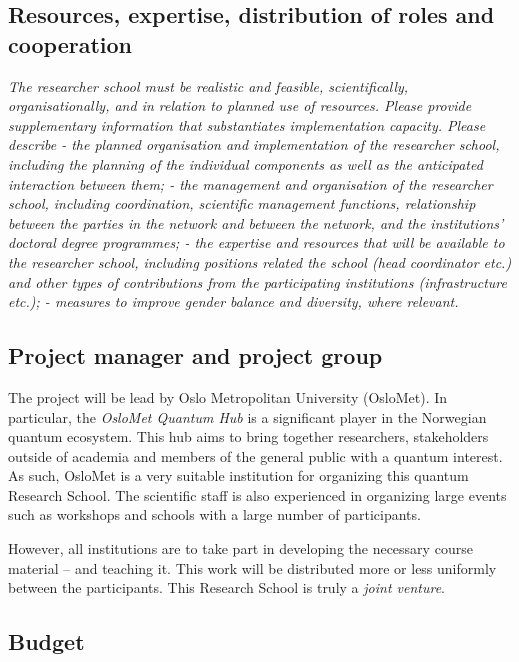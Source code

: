 \documentclass{scrreprt}
\begin{document}
\subsection{Resources, expertise, distribution of roles and cooperation}

\textit{The researcher school must be realistic and feasible, scientifically, organisationally, and in relation to planned use of resources. Please provide supplementary information that substantiates implementation capacity. Please describe
-	the planned organisation and implementation of the researcher school, including the planning of the individual components as well as the anticipated interaction between them;  
-	the management and organisation of the researcher school, including coordination, scientific management functions, relationship between the parties in the network and between the network, and the institutions’ doctoral degree programmes;  
-	the expertise and resources that will be available to the researcher school, including positions related the school (head coordinator etc.) and other types of contributions from the participating institutions (infrastructure etc.);
-	measures to improve gender balance and diversity, where relevant.}

\subsection{Project manager and project group}
The project will be lead by Oslo Metropolitan University (OsloMet). In particular, the \textit{OsloMet Quantum Hub} is a significant player in the Norwegian quantum ecosystem. This hub aims to bring together researchers, stakeholders outside of academia and members of the general public with a quantum interest. As such, OsloMet is a very suitable institution for organizing this quantum Research School. The scientific staff is also experienced in organizing large events such as workshops and schools with a large number of participants.

However, all institutions are to take part in developing the necessary course material -- and teaching it. This work will be distributed more or less uniformly between the participants. This Research School is truly a \textit{joint venture}.




\subsection{Budget}
\end{document}
